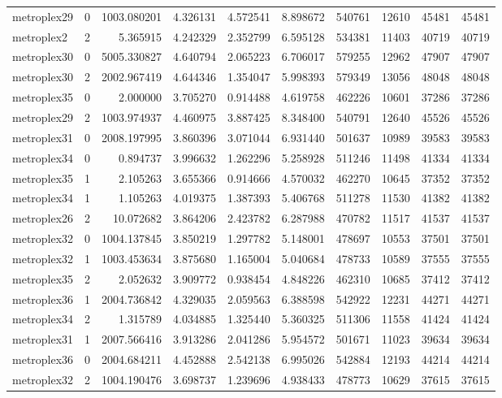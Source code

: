 \begin{longtable}{|l|r|r|r|r|r|r|r|r|r|}
metroplex29 & 0 & 1003.080201 & 4.326131 & 4.572541 & 8.898672 & 540761 & 12610 & 45481 & 45481 \\
metroplex2 & 2 & 5.365915 & 4.242329 & 2.352799 & 6.595128 & 534381 & 11403 & 40719 & 40719 \\
metroplex30 & 0 & 5005.330827 & 4.640794 & 2.065223 & 6.706017 & 579255 & 12962 & 47907 & 47907 \\
metroplex30 & 2 & 2002.967419 & 4.644346 & 1.354047 & 5.998393 & 579349 & 13056 & 48048 & 48048 \\
metroplex35 & 0 & 2.000000 & 3.705270 & 0.914488 & 4.619758 & 462226 & 10601 & 37286 & 37286 \\
metroplex29 & 2 & 1003.974937 & 4.460975 & 3.887425 & 8.348400 & 540791 & 12640 & 45526 & 45526 \\
metroplex31 & 0 & 2008.197995 & 3.860396 & 3.071044 & 6.931440 & 501637 & 10989 & 39583 & 39583 \\
metroplex34 & 0 & 0.894737 & 3.996632 & 1.262296 & 5.258928 & 511246 & 11498 & 41334 & 41334 \\
metroplex35 & 1 & 2.105263 & 3.655366 & 0.914666 & 4.570032 & 462270 & 10645 & 37352 & 37352 \\
metroplex34 & 1 & 1.105263 & 4.019375 & 1.387393 & 5.406768 & 511278 & 11530 & 41382 & 41382 \\
metroplex26 & 2 & 10.072682 & 3.864206 & 2.423782 & 6.287988 & 470782 & 11517 & 41537 & 41537 \\
metroplex32 & 0 & 1004.137845 & 3.850219 & 1.297782 & 5.148001 & 478697 & 10553 & 37501 & 37501 \\
metroplex32 & 1 & 1003.453634 & 3.875680 & 1.165004 & 5.040684 & 478733 & 10589 & 37555 & 37555 \\
metroplex35 & 2 & 2.052632 & 3.909772 & 0.938454 & 4.848226 & 462310 & 10685 & 37412 & 37412 \\
metroplex36 & 1 & 2004.736842 & 4.329035 & 2.059563 & 6.388598 & 542922 & 12231 & 44271 & 44271 \\
metroplex34 & 2 & 1.315789 & 4.034885 & 1.325440 & 5.360325 & 511306 & 11558 & 41424 & 41424 \\
metroplex31 & 1 & 2007.566416 & 3.913286 & 2.041286 & 5.954572 & 501671 & 11023 & 39634 & 39634 \\
metroplex36 & 0 & 2004.684211 & 4.452888 & 2.542138 & 6.995026 & 542884 & 12193 & 44214 & 44214 \\
metroplex32 & 2 & 1004.190476 & 3.698737 & 1.239696 & 4.938433 & 478773 & 10629 & 37615 & 37615 \\

\end{longtable}

